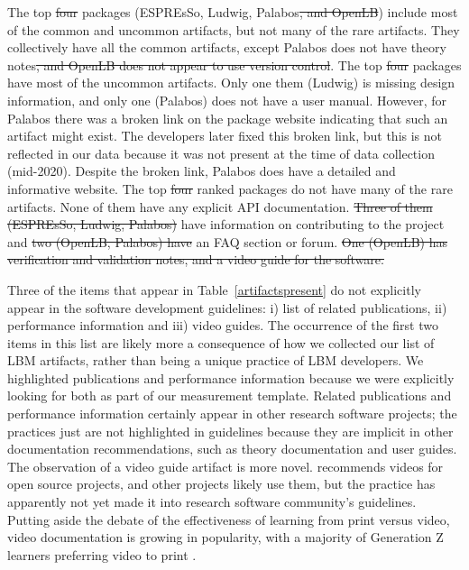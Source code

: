 \documentclass[final, 3p, times, authoryear]{elsarticle}
\providecommand{\DIFaddtex}[1]{{\protect\color{blue}\uwave{#1}}} %
\providecommand{\DIFdeltex}[1]{{\protect\color{red}\sout{#1}}}                      %
\providecommand{\DIFaddbegin}{} %
\providecommand{\DIFaddend}{} %
\providecommand{\DIFdelbegin}{} %
\providecommand{\DIFdelend}{} %
\providecommand{\DIFadd}[1]{\texorpdfstring{\DIFaddtex{#1}}{#1}} %
\providecommand{\DIFdel}[1]{\texorpdfstring{\DIFdeltex{#1}}{}} %
\begin{document}
The top \DIFdelbegin \DIFdel{four }\DIFdelend \DIFaddbegin \DIFadd{three }\DIFaddend packages (ESPREsSo, Ludwig, Palabos\DIFdelbegin \DIFdel{, and OpenLB}\DIFdelend ) include most of
the common and uncommon artifacts, but not many of the rare artifacts.  They
collectively have all the common artifacts, except Palabos does not have theory
notes\DIFdelbegin \DIFdel{, and OpenLB does not appear to use version control}\DIFdelend .  The top \DIFdelbegin \DIFdel{four }\DIFdelend \DIFaddbegin \DIFadd{three }\DIFaddend packages
have most of the uncommon artifacts. Only one them (Ludwig) is missing design
information, and only one (Palabos) does not have a user manual.  However, for
Palabos there was a broken link on the package website indicating that such an
artifact might exist. The developers later fixed this broken link, but this is
not reflected in our data because it was not present at the time of data
collection (mid-2020). Despite the broken link, Palabos does have a detailed and informative website. The top \DIFdelbegin \DIFdel{four }\DIFdelend \DIFaddbegin \DIFadd{three }\DIFaddend ranked packages do not have many of the rare artifacts. None of them have any explicit API documentation. \DIFdelbegin \DIFdel{Three of them (ESPREsSo, Ludwig, Palabos) }\DIFdelend \DIFaddbegin \DIFadd{All of them }\DIFaddend have information on contributing to the project and
\DIFdelbegin \DIFdel{two (OpenLB, Palabos) have }\DIFdelend \DIFaddbegin \DIFadd{one (Palabos) has }\DIFaddend an FAQ section or forum. 
\DIFdelbegin \DIFdel{One (OpenLB) has
verification and validation notes, and a video guide for the software. 
}\DIFdelend 

Three of the items that appear in Table~\ref{artifactspresent} do not explicitly
appear in the software development guidelines: i) list of related publications,
ii) performance information and iii) video guides.  The occurrence of the first
two items in this list are likely more a consequence of how we collected our
list of LBM artifacts, rather than being a unique practice of LBM developers. We
highlighted publications and performance information because we were explicitly
looking for both as part of our measurement template. Related
publications and performance information certainly appear in other research
software projects; the practices just are not highlighted in guidelines because
they are implicit in other documentation recommendations, such as theory
documentation and user guides. The observation of a video guide artifact is more
novel.  \citet{Fogel2005} recommends videos for open source projects, and other
projects likely use them, but the practice has apparently not yet made it into
research software community's guidelines.  Putting aside the debate of the
effectiveness of learning from print versus video, video documentation is
growing in popularity, with a majority of Generation Z learners preferring video
to print \citep{Genota2018}.
\end{document}
